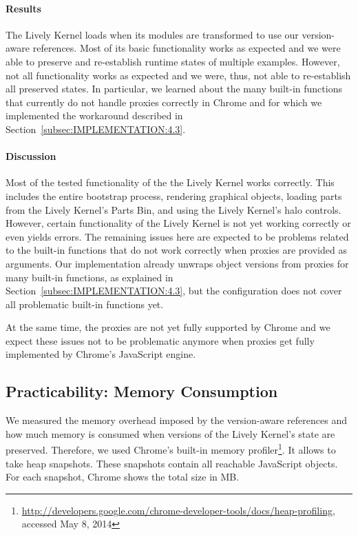 \documentclass{sigplanconf}
\begin{document}
\paragraph{Results}
The Lively Kernel loads when its modules are transformed to use our
version-aware references.  Most of its basic functionality works as
expected and we were able to preserve and re-establish runtime states
of multiple examples.  However, not all functionality works as
expected and we were, thus, not able to re-establish all preserved
states.  In particular, we learned about the many built-in functions
that currently do not handle proxies correctly in Chrome and for which
we implemented the workaround described in
Section~\ref{subsec:IMPLEMENTATION:4.3}.

\paragraph{Discussion}
Most of the tested functionality of the the Lively Kernel works
correctly.  This includes the entire bootstrap process, rendering
graphical objects, loading parts from the Lively Kernel's Parts Bin,
and using the Lively Kernel's halo controls.  However, certain
functionality of the Lively Kernel is not yet working correctly or
even yields errors.  The remaining issues here are expected to be
problems related to the built-in functions that do not work correctly
when proxies are provided as arguments.  Our implementation already
unwraps object versions from proxies for many built-in functions, as
explained in Section~\ref{subsec:IMPLEMENTATION:4.3}, but the
configuration does not cover all problematic built-in functions yet.

At the same time, the proxies are not yet fully supported by Chrome
and we expect these issues not to be problematic anymore when proxies
get fully implemented by Chrome's JavaScript engine.

\subsection{Practicability: Memory Consumption} \label{sec:EVALUATION:3}

We measured the memory overhead imposed by the version-aware
references and how much memory is consumed when versions of the Lively
Kernel's state are preserved. Therefore, we used Chrome's built-in
memory
profiler\footnote{\url{http://developers.google.com/chrome-developer-tools/docs/heap-profiling},
  accessed May 8, 2014}.  It allows to take heap snapshots.  These
snapshots contain all reachable JavaScript objects.  For each
snapshot, Chrome shows the total size in MB.
\end{document}
